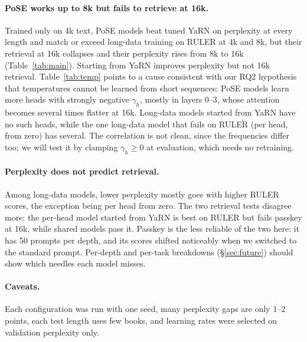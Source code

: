 \paragraph{PoSE works up to 8k but fails to retrieve at 16k.}
Trained only on 4k text, PoSE models beat tuned YaRN on perplexity at every length and match or exceed long-data training on RULER at 4k and 8k, but their retrieval at 16k collapses and their perplexity rises from 8k to 16k (Table~\ref{tab:main}). Starting from YaRN improves perplexity but not 16k retrieval. Table~\ref{tab:temp} points to a cause consistent with our RQ2 hypothesis that temperatures cannot be learned from short sequences: PoSE models learn more heads with strongly negative $\gamma_h$, mostly in layers 0--3, whose attention becomes several times flatter at 16k. Long-data models started from YaRN have no such heads, while the one long-data model that fails on RULER (per head, from zero) has several. The correlation is not clean, since the frequencies differ too; we will test it by clamping $\gamma_h \geq 0$ at evaluation, which needs no retraining.

\paragraph{Perplexity does not predict retrieval.}
Among long-data models, lower perplexity mostly goes with higher RULER scores, the exception being per head from zero. The two retrieval tests disagree more: the per-head model started from YaRN is best on RULER but fails passkey at 16k, while shared models pass it. Passkey is the less reliable of the two here: it has 50 prompts per depth, and its scores shifted noticeably when we switched to the standard prompt. Per-depth and per-task breakdowns (\S\ref{sec:future}) should show which needles each model misses.

\paragraph{Caveats.}
Each configuration was run with one seed, many perplexity gaps are only 1--2 points, each test length uses few books, and learning rates were selected on validation perplexity only.

